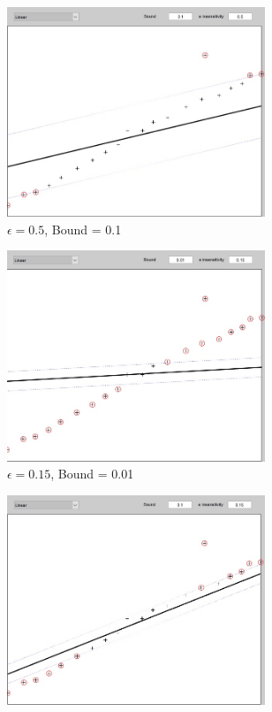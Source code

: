 \begin{figure}[ht]
\begin{subfigure}[b]{0.3\textwidth}
		\includegraphics[width = 0.85\textwidth]{Exercise2/Report/Ex2.1_E=0.5_B=0.1}
		\caption{$\epsilon = 0.5$, Bound = 0.1 }\label{fig:lin_E=0.5_B=0.1}
	\end{subfigure}
	\begin{subfigure}[b]{0.3\textwidth}
		\centering
		\includegraphics[width = 0.85\textwidth]{Exercise2/Report/Ex2.1_E=0.15_B=0.01}
		\caption{$\epsilon = 0.15$, Bound = 0.01 }\label{fig:lin_E=0.15_B=0.01}
	\end{subfigure}%
	\begin{subfigure}[b]{0.3\textwidth}
		\centering
		\includegraphics[width = 0.85\textwidth]{Exercise2/Report/Ex2.1_E=0.15_B=0.1}

\end{subfigure}
\end{figure}
